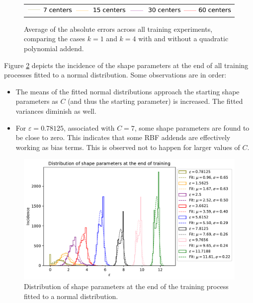 \documentclass[12pt]{report} %
\begin{document}
\begin{figure}
\begin{tabular}{cc}
    \multicolumn{2}{c}{{\includegraphics[width=.8\textwidth]{imagenes/experiments/1d/statistical_1d_full_scheduler_interpolation/legend_avg.pdf}}} 
   \end{tabular}
   \caption{Average of the absolute errors across all training experiments, comparing the cases $k=1$ and $k=4$ with and without a quadratic polynomial addend.}
  \label{fig:u2-results-average-error}
\end{figure}



Figure \ref{fig:u2-results-shape-parameters} depicts the incidence of the shape parameters at the end of all training processes fitted to a normal distribution. Some observations are in order:
\begin{itemize}
  \item The means of the fitted normal distributions approach the starting shape parameters as $C$ (and thus the starting parameter) is increased. The fitted variances diminish as well.
  \item For $\varepsilon=0.78125$, associated with $C=7$, some shape parameters are found to be close to zero. This indicates that some RBF addends are effectively working as bias terms. This is observed not to happen for larger values of $C$.
\end{itemize}

\begin{figure}
  \includegraphics[width=\textwidth]{imagenes/experiments/1d/statistical_1d_full_scheduler_interpolation/distribution_of_shape_parameters_at_end_of_training.pdf}
  \caption{Distribution of shape parameters at the end of the training process fitted to a normal distribution.}
  \label{fig:u2-results-shape-parameters}
\end{figure}
\end{document}
